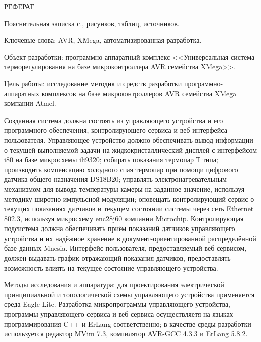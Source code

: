 \begin{center}\MakeUppercase{Реферат}\end{center}

Пояснительная записка  с.,  рисунков,  таблиц,
 источников.


Ключевые слова: AVR, XMega, автоматизированная разработка.


Объект разработки: программно-аппаратный комплекс <<Универсальная система терморегулирования
 на базе микроконтроллера AVR семейства XMega>>.

Цель работы: исследование методик и средств разработки про\-гра\-ммно\--аппа\-ра\-тных комплексов на базе
микроконтроллеров AVR семейства XMega компании Atmel.

Созданная система должна состоять из управляющего устройства и его программного обеспечения,
контролирующего сервиса и веб-интерфейса пользователя. Управляющее устройство должно обеспечивать
вывод информации о текущей выполняемой задачи на жидкокристаллический дисплей с интерфейсом i80 на
базе микросхемы ili9320;
собирать показания термопар Т типа; производить компенсацию холодного спая термопар при помощи цифрового датчика
общего назначения DS18B20; управлять электронагревательным механизмом для вывода температуры
камеры на заданное значение, используя методику широтно-импульсной модуляции; оповещать контролирующий
сервис о текущих показаниях датчиков и текущем состоянии системы через сеть Ethernet 802.3, используя
микросхему enc28j60 компании Microchip. Контролирующая подсистема должна обеспечивать приём показаний
датчиков управляющего устройства и их надёжное хранение в документ-ориентированной распределённой базе
данных Mnesia. Интерфейс пользователя, предоставляемый веб-сервисом, должен выдавать график отражающий
показания датчиков, предоставлять возможность влиять на текущее состояние управляющего устройства.



Методы исследования и аппаратура: для проектирования электрической принципиальной и
топологической схемы управляющего устройства применяется среда Eagle Lite. Разработка
микропрограммы управляющего устройства, программы управляющего сервиса и веб-сервиса осуществляетя
на языках программирования C++ и ErLang соответственно; в качестве среды разработки используется
редактор MVim 7.3, компилятор AVR-GCC 4.3.3 и ErLang 5.8.2.


